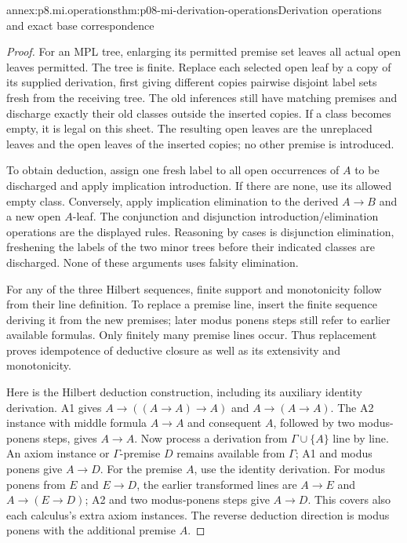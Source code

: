 \begin{annexitem}{annex:p8.mi.operations}{thm:p08-mi-derivation-operations}{Derivation operations and exact base correspondence}
\begin{proof}
For an MPL tree, enlarging its permitted premise set leaves all actual
open leaves permitted. The tree is finite. Replace each selected open
leaf by a copy of its supplied derivation, first giving different copies
pairwise disjoint label sets fresh from the receiving tree. The old
inferences still have matching premises and discharge exactly their old
classes outside the inserted copies. If a class becomes empty, it is
legal on this sheet. The resulting open leaves are the unreplaced leaves
and the open leaves of the inserted copies; no other premise is introduced.

To obtain deduction, assign one fresh label to all open occurrences of
\(A\) to be discharged and apply implication introduction. If there are
none, use its allowed empty class. Conversely, apply implication
elimination to the derived \(A\to B\) and a new open \(A\)-leaf.
The conjunction and disjunction introduction/elimination operations are
the displayed rules. Reasoning by cases is disjunction elimination,
freshening the labels of the two minor trees before their indicated
classes are discharged. None of these arguments uses falsity elimination.

For any of the three Hilbert sequences, finite support and monotonicity
follow from their line definition. To replace a premise line, insert
the finite sequence deriving it from the new premises; later modus
ponens steps still refer to earlier available formulas. Only finitely
many premise lines occur. Thus replacement proves idempotence of
deductive closure as well as its extensivity and monotonicity.

Here is the Hilbert deduction construction, including its auxiliary
identity derivation. A1 gives \(A\to((A\to A)\to A)\) and
\(A\to(A\to A)\). The A2 instance with middle formula \(A\to A\)
and consequent \(A\), followed by two modus-ponens steps, gives
\(A\to A\). Now process a derivation from \(\Gamma\cup\{A\}\)
line by line. An axiom instance or \(\Gamma\)-premise \(D\) remains
available from \(\Gamma\); A1 and modus ponens give \(A\to D\).
For the premise \(A\), use the identity derivation. For modus ponens
from \(E\) and \(E\to D\), the earlier transformed lines are
\(A\to E\) and \(A\to(E\to D)\); A2 and two modus-ponens steps
give \(A\to D\). This covers also each calculus's extra axiom
instances. The reverse deduction direction is modus ponens with the
additional premise \(A\).


\end{proof}
\end{annexitem}

